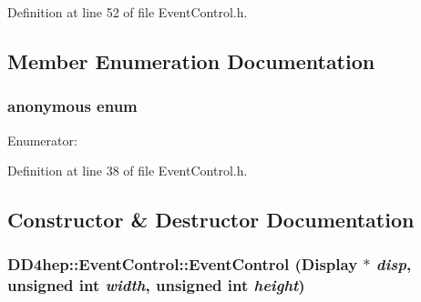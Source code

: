 Definition at line 52 of file EventControl.h.

\subsection{Member Enumeration Documentation}
\hypertarget{class_d_d4hep_1_1_event_control_a9a7c581934b4dff35b3753b630b15f74}{
\subsubsection[{"@18}]{\setlength{\rightskip}{0pt plus 5cm}anonymous enum}}
\label{class_d_d4hep_1_1_event_control_a9a7c581934b4dff35b3753b630b15f74}
\begin{Desc}
\item[Enumerator: ]\par
\begin{description}
\item[{\em 
\hypertarget{class_d_d4hep_1_1_event_control_a9a7c581934b4dff35b3753b630b15f74a0e8834462de33571d882f9225d1ca704}{
NUM\_\-DATA\_\-LINES}
\label{class_d_d4hep_1_1_event_control_a9a7c581934b4dff35b3753b630b15f74a0e8834462de33571d882f9225d1ca704}
}]\end{description}
\end{Desc}



Definition at line 38 of file EventControl.h.

\subsection{Constructor \& Destructor Documentation}
\hypertarget{class_d_d4hep_1_1_event_control_a5abad625ba8ddb768f2dff26ec06c987}{
\subsubsection[{EventControl}]{\setlength{\rightskip}{0pt plus 5cm}DD4hep::EventControl::EventControl ({\bf Display} $\ast$ {\em disp}, \/  unsigned int {\em width}, \/  unsigned int {\em height})}}
\label{class_d_d4hep_1_1_event_control_a5abad625ba8ddb768f2dff26ec06c987}



